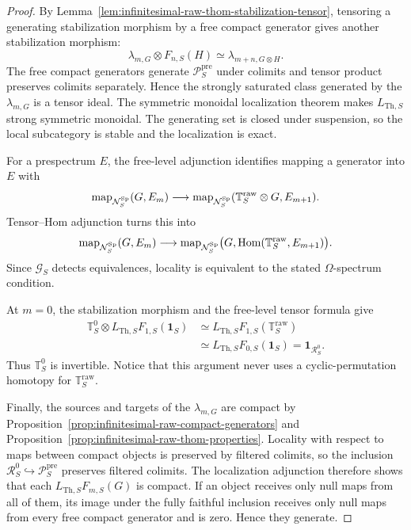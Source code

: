 \begin{proof}
By Lemma~\ref{lem:infinitesimal-raw-thom-stabilization-tensor}, tensoring a
generating stabilization morphism by a free compact generator gives another
stabilization morphism:
\[
  \lambda_{m,G}\otimes F_{n,S}(H)
  \simeq
  \lambda_{m+n,G\otimes H}.
\]
The free compact generators generate \(\mathcal P_S^{\mathrm{pre}}\) under
colimits and tensor product preserves colimits separately.  Hence the strongly
saturated class generated by the \(\lambda_{m,G}\) is a tensor ideal.  The
symmetric monoidal localization theorem makes \(L_{\mathrm{Th},S}\) strong
symmetric monoidal.  The generating set is closed under suspension, so the
local subcategory is stable and the localization is exact.

For a prespectrum \(E\), the free-level adjunction identifies mapping a
generator into \(E\) with
\[
  \operatorname{map}_{\mathcal N_S^{\mathrm{Sp}}}(G,E_m)
  \longrightarrow
  \operatorname{map}_{\mathcal N_S^{\mathrm{Sp}}}
  (\mathbb T_S^{\mathrm{raw}}\otimes G,E_{m+1}).
\]
Tensor--Hom adjunction turns this into
\[
  \operatorname{map}_{\mathcal N_S^{\mathrm{Sp}}}(G,E_m)
  \longrightarrow
  \operatorname{map}_{\mathcal N_S^{\mathrm{Sp}}}
  \bigl(G,\operatorname{Hom}(\mathbb T_S^{\mathrm{raw}},E_{m+1})\bigr).
\]
Since \(\mathcal G_S\) detects equivalences, locality is equivalent to the
stated \(\Omega\)-spectrum condition.

At \(m=0\), the stabilization morphism and the free-level tensor formula give
\[
\begin{aligned}
  \mathbb T_S^0\otimes L_{\mathrm{Th},S}F_{1,S}(\mathbf1_S)
  &\simeq
  L_{\mathrm{Th},S}F_{1,S}(\mathbb T_S^{\mathrm{raw}})\\
  &\simeq
  L_{\mathrm{Th},S}F_{0,S}(\mathbf1_S)
   =\mathbf1_{\mathcal R_S^0}.
\end{aligned}
\]
Thus \(\mathbb T_S^0\) is invertible.  Notice that this argument never uses a
cyclic-permutation homotopy for \(\mathbb T_S^{\mathrm{raw}}\).

Finally, the sources and targets of the \(\lambda_{m,G}\) are compact by
Proposition~\ref{prop:infinitesimal-raw-compact-generators} and
Proposition~\ref{prop:infinitesimal-raw-thom-properties}.  Locality with respect
to maps between compact objects is preserved by filtered colimits, so the
inclusion \(\mathcal R_S^0\hookrightarrow\mathcal P_S^{\mathrm{pre}}\)
preserves filtered colimits.  The localization adjunction therefore shows that
each \(L_{\mathrm{Th},S}F_{m,S}(G)\) is compact.  If an object receives only
null maps from all of them, its image under the fully faithful inclusion
receives only null maps from every free compact generator and is zero.  Hence
they generate.
\end{proof}


